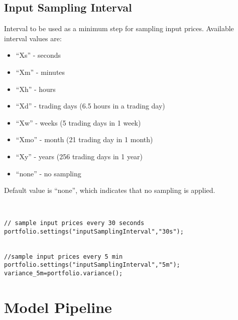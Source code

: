 \documentclass[letterpaper]{report}
\begin{document}
\subsection{Input Sampling Interval}
Interval to be used as a minimum step for sampling input prices. Available interval values are: 
  \begin{itemize} 
\item ``Xs'' - seconds
\item ``Xm'' - minutes
\item ``Xh'' - hours
\item ``Xd'' - trading days (6.5 hours in a trading day)
\item ``Xw'' - weeks (5 trading days in 1 week)
\item ``Xmo'' - month (21 trading day in 1 month)
\item ``Xy'' - years (256 trading days in 1 year)
\item ``none'' - no sampling
\end{itemize}
Default value is ``none'', which indicates that no sampling is applied.
\begin{lstlisting}


// sample input prices every 30 seconds
portfolio.settings("inputSamplingInterval","30s");


//sample input prices every 5 min
portfolio.settings("inputSamplingInterval","5m");
variance_5m=portfolio.variance();

\end{lstlisting}


\section{Model Pipeline}
\end{document}
